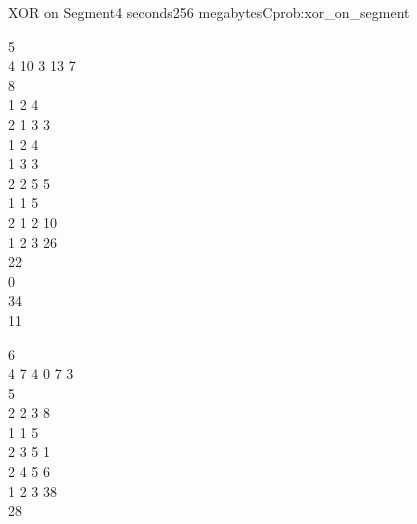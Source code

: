 \begin{programmingproblem}{XOR on Segment}{4 seconds}{256 megabytes}{C}{prob:xor_on_segment}
    \begin{problemexamples}
        \begin{example}{
            5\\
            4 10 3 13 7\\
            8\\
            1 2 4\\
            2 1 3 3\\
            1 2 4\\
            1 3 3\\
            2 2 5 5\\
            1 1 5\\
            2 1 2 10\\
            1 2 3
        }{
            26\\
            22\\
            0\\
            34\\
            11
        }
        \end{example}
        \begin{example}{
            6\\
            4 7 4 0 7 3\\
            5\\
            2 2 3 8\\
            1 1 5\\
            2 3 5 1\\
            2 4 5 6\\
            1 2 3
        }{
            38\\
            28
        }
        \end{example}
    \end{problemexamples}
    
\end{programmingproblem}